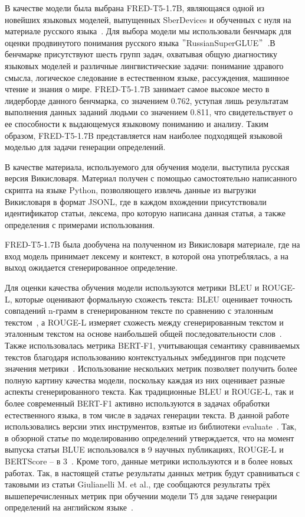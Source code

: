 \documentclass[LI,VKR]{HSEUniversity}
\begin{document}
В качестве модели была выбрана FRED-T5-1.7B, являющаяся одной из новейших языковых моделей,
выпущенных SberDevices и обученных с нуля на материале русского языка~\cite{FRED-T5}.
Для выбора модели мы использовали бенчмарк для оценки продвинутого понимания русского языка
\("\)RussianSuperGLUE\("\)~\cite{RussianSuperGLUE}.В бенчмарке присутствуют шесть групп задач, охватывая
общую диагностику языковых моделей и различные лингвистические задачи: понимание здравого смысла, логическое
следование в естественном языке, рассуждения, машинное чтение и знания о мире.
FRED-T5-1.7B занимает самое высокое место в лидерборде данного бенчмарка, со значением 0.762,
уступая лишь результатам выполнения данных заданий людьми со значением 0.811,
что свидетельствует о ее способности к выдающемуся языковому пониманию и анализу.
Таким образом, FRED-T5-1.7B представляется нам наиболее подходящей языковой моделью
для задачи генерации определений.

В качестве материала, используемого для обучения модели, выступила русская версия Викисловаря.
Материал получен с помощью самостоятельно написанного скрипта на языке Python, позволяющего
извлечь данные из выгрузки Викисловаря в формат JSONL, где в каждом вхождении присутствовали
идентификатор статьи, лексема, про которую написана данная статья, а также определения
с примерами использования.

FRED-T5-1.7B была дообучена на полученном из Викисловаря материале, где на вход модель
принимает лексему и контекст, в которой она употреблялась, а на выход ожидается сгенерированное
определение.

Для оценки качества обучения модели используются метрики BLEU и ROUGE-L,
которые оценивают формальную схожесть текста: BLEU оценивает точность совпадений n-грамм
в сгенерированном тексте по сравнению с эталонным текстом~\cite{BLUE}, а ROUGE-L измеряет схожесть между
сгенерированным текстом и эталонным текстом на основе наибольшей общей последовательности слов~\cite{ROUGE}.
Также использовалась метрика BERT-F1, учитывающая семантику сравниваемых текстов благодаря
использованию контекстуальных эмбеддингов при подсчете значения метрики~\cite{BERTScore}.
Использование нескольких метрик позволяет получить более полную картину качества модели,
поскольку каждая из них оценивает разные аспекты сгенерированного текста.
Как традиционные BLEU и ROUGE-L, так и более современный BERT-F1 активно используются в
задачах обработки естественного языка, в том числе в задачах генерации текста.
В данной работе использовались версии этих инструментов, взятые из библиотеки evaluate~\cite{Evaluate}.
Так, в обзорной статье по моделированию определений утверждается, что на момент выпуска статьи BLUE
использовался в 9 научных публикациях, ROUGE-L и BERTScore – в 3~\cite{DefinitionModelingReviewAndDatasetAnalysis}.
Кроме того, данные метрики используются и в более новых работах.
Так, в настоящей статье результаты данных метрик будут сравниваться с таковыми из статьи
Giulianelli M. et al., где сообщаются результаты трёх вышеперечисленных метрик при обучении модели
Т5 для задаче генерации определений на английском языке~\cite{DefinitionGenerationMainArticle}.

\printbibliography
\end{document}
